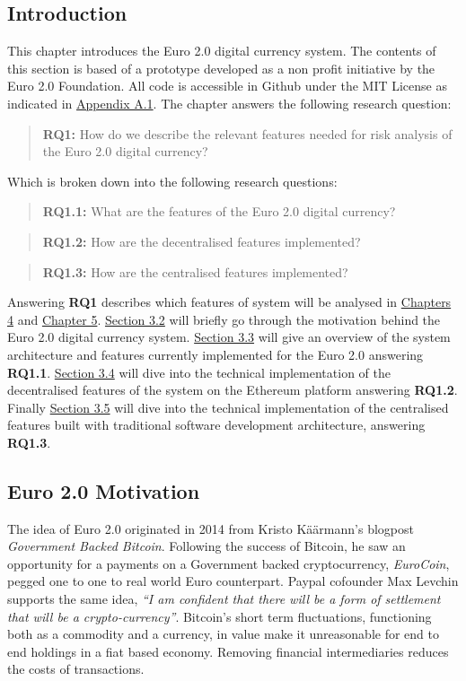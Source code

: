 \documentclass[12pt]{article} %
\begin{document}
\subsection{Introduction} \label{ssec:3.1}
This chapter introduces the Euro 2.0 digital currency system. The contents of this section is based of a prototype developed as a non profit initiative by the Euro 2.0 Foundation. All code is accessible in Github under the MIT License as indicated in \hyperref[ssec:a.1]{Appendix A.1}. The chapter answers the following research question:
\begin{quotation}
\textbf{RQ1:} How do we describe the relevant features needed for risk analysis of the Euro 2.0 digital currency?
\end{quotation}
Which is broken down into the following research questions:
\begin{quotation}
	\textbf{RQ1.1:} What are the features of the Euro 2.0 digital currency?
\end{quotation}{
\begin{quotation}
	\textbf{RQ1.2:} How are the decentralised features implemented?
\end{quotation}{
\begin{quotation}
	\textbf{RQ1.3:} How are the centralised features implemented?
\end{quotation}
Answering \textbf{RQ1} describes which features of system will be analysed in \hyperref[sec:4]{Chapters 4} and \hyperref[sec:5]{Chapter 5}. \hyperref[ssec:3.2]{Section 3.2} will briefly go through the motivation behind the Euro 2.0 digital currency system. \hyperref[ssec:3.3]{Section 3.3} will give an overview of the system architecture and features currently implemented for the Euro 2.0 answering \textbf{RQ1.1}. \hyperref[ssec:3.4]{Section 3.4} will dive into the technical implementation of the decentralised features of the system on the Ethereum platform answering \textbf{RQ1.2}. Finally \hyperref[ssec:3.5]{Section 3.5} will dive into the technical implementation of the centralised features built with traditional software development architecture, answering \textbf{RQ1.3}.

\subsection{Euro 2.0 Motivation} \label{ssec:3.2}

The idea of Euro 2.0 originated in 2014 from Kristo Käärmann's blogpost \textit{Government Backed Bitcoin}\cite{kaarmann2014government}. Following the success of Bitcoin, he saw an opportunity for a payments on a Government backed cryptocurrency, \textit{EuroCoin}, pegged one to one to real world Euro counterpart. Paypal cofounder Max Levchin supports the same idea, \textit{``I am confident that there will be a form of settlement that will be a crypto-currency''}\cite{pando2014levchin}. Bitcoin's short term fluctuations, functioning both as a commodity and a currency, in value make it unreasonable for end to end holdings in a fiat based economy. Removing financial intermediaries reduces the costs of transactions.

}}
\end{document}
